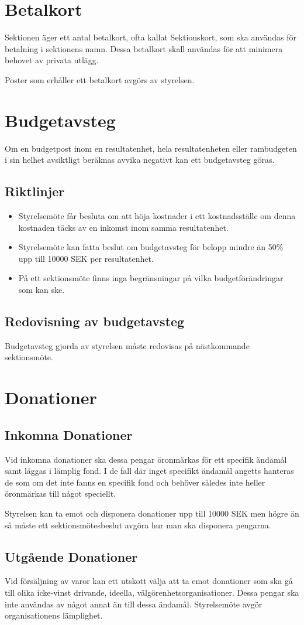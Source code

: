 \documentclass{dsekprotokoll}
\begin{document}
\section{Betalkort}
Sektionen äger ett antal betalkort, ofta kallat Sektionskort, som ska användas för betalning i sektionens namn. Dessa betalkort skall användas för att minimera behovet av privata utlägg.

Poster som erhåller ett betalkort avgörs av styrelsen.

\section{Budgetavsteg}
Om en budgetpost inom en resultatenhet, hela resultatenheten eller rambudgeten i sin helhet avsiktligt beräknas avvika negativt kan ett budgetavsteg göras.

\subsection{Riktlinjer}
\begin{itemize}
  \item Styrelsemöte får besluta om att höja kostnader i ett kostnadsställe om denna kostnaden täcks av en inkomst inom samma resultatenhet.
  \item Styrelsemöte kan fatta beslut om budgetavsteg för belopp mindre än 50\% upp till 10000 SEK per resultatenhet.
  \item På ett sektionsmöte finns inga begränsningar på vilka budgetförändringar som kan ske.
\end{itemize}

\subsection{Redovisning av budgetavsteg}
Budgetavsteg gjorda av styrelsen måste redovisas på nästkommande sektionsmöte.

\section{Donationer}
\subsection{Inkomna Donationer}
Vid inkomna donationer ska dessa pengar öronmärkas för ett specifik ändamål samt läggas i lämplig fond. I de fall där inget specifikt ändamål angetts hanteras de som om det inte fanns en specifik fond och behöver således inte heller öronmärkas till något speciellt.

Styrelsen kan ta emot och disponera donationer upp till 10000 SEK men högre än så måste ett sektionsmötesbeslut avgöra hur man ska disponera pengarna.

\subsection{Utgående Donationer}
Vid försäljning av varor kan ett utskott välja att ta emot donationer som ska gå till olika icke-vinst drivande, ideella, välgörenhetsorganisationer. Dessa pengar ska inte användas av något annat än till dessa ändamål. Styrelsemöte avgör organisationens lämplighet.
\end{document}

